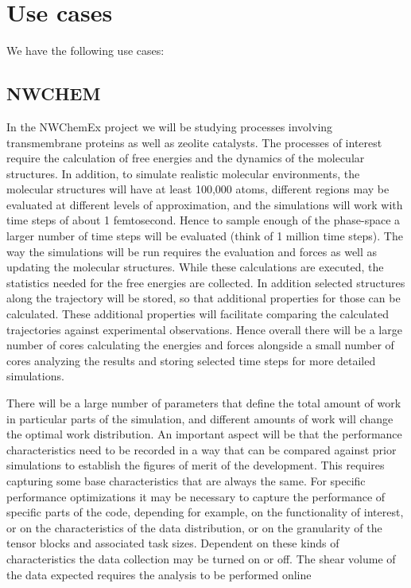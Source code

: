 \section{Use cases}
We have the following use cases:

\subsection{NWCHEM}
In the NWChemEx project we will be studying processes involving transmembrane proteins as well as zeolite catalysts. The processes of interest require the calculation of free energies and the dynamics of the molecular structures. In addition, to simulate realistic molecular environments, the molecular structures will have at least 100,000 atoms, different regions may be evaluated at different levels of approximation, and the simulations will work with time steps of about 1 femtosecond.  Hence to sample enough of the phase-space a larger number of time steps will be evaluated (think of 1 million time steps). The way the simulations will be run requires the evaluation and forces as well as updating the molecular structures. While these calculations are executed, the statistics needed for the free energies are collected. In addition selected structures along the trajectory will be stored, so that additional properties for those can be calculated. These additional properties will facilitate comparing the calculated trajectories against experimental observations.  Hence overall there will be a large number of cores calculating the energies and forces alongside a small number of cores analyzing the results and storing selected time steps for more detailed simulations. 

There will be a large number of parameters that define the total amount of work in particular parts of the simulation, and different amounts of work will change the optimal work distribution. An important aspect will be that the performance characteristics need to be recorded in a way that can be compared against prior simulations to establish the figures of merit of the development. This requires capturing some base characteristics that are always the same. 
For specific performance optimizations it may be necessary to capture the performance of specific parts of the code, depending for example, on the functionality of interest, or on the characteristics of the data distribution, or on the granularity of the tensor blocks and associated task sizes. Dependent on these kinds of characteristics the data collection may be turned on or off. The shear volume of the data expected requires the analysis to be performed online


